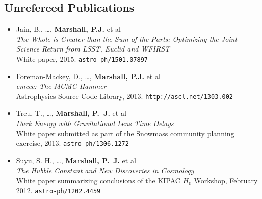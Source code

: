 
\vspace{2\baselineskip}


\subsection*{Unrefereed Publications}

\begin{itemize}

\item{Jain, B., \ldots, \textbf{Marshall, P.J.} et al\\
\textit{The Whole is Greater than the Sum of the Parts: Optimizing the Joint Science Return from LSST, Euclid and WFIRST}\\
White paper, 2015.
\texttt{astro-ph/1501.07897}
}

\item{{Foreman-Mackey}, D., \ldots, \textbf{Marshall, P.J.} et al\\
\textit{emcee: The MCMC Hammer}\\
Astrophysics Source Code Library, 2013.
\texttt{http://ascl.net/1303.002}
}

\item{Treu, T., \ldots, \textbf{{Marshall}, P.~J.} et al\\
\textit{Dark Energy with Gravitational Lens Time Delays}\\
White paper submitted as part of the Snowmass community planning exercise, 2013.
\texttt{astro-ph/1306.1272}
}



\item{{Suyu}, S. H., \ldots, \textbf{{Marshall}, P.~J.} et al\\
\textit{The Hubble Constant and New Discoveries in Cosmology}\\
White paper summarizing conclusions of the KIPAC $H_0$ Workshop, February 2012.
\texttt{astro-ph/1202.4459}
}



\end{itemize}
